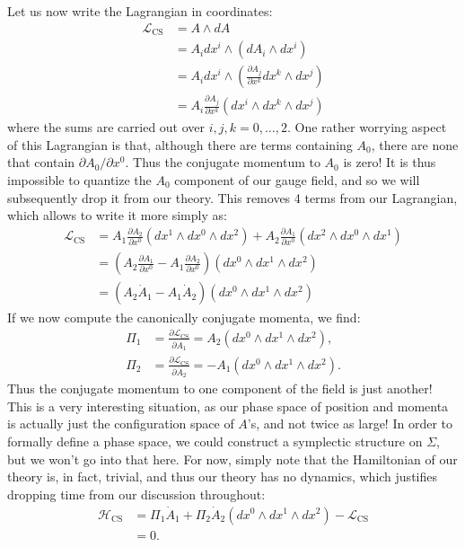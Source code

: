 \documentclass[12pt]{article}
\begin{document}
Let us now write the Lagrangian in coordinates:
\begin{align*}
\mathcal{L}_{\text{CS}}&=A\wedge dA\\
&=A_i dx^i\wedge \left(dA_i\wedge dx^i\right)\\
&=A_i dx^i\wedge\left(\frac{\partial A_j}{\partial x^k} dx^k\wedge dx^j\right)\\
&=A_i\frac{\partial A_j}{\partial x^k}\left(dx^i\wedge dx^k\wedge dx^j \right)
\end{align*}
where the sums are carried out over $i,j,k=0,\ldots,2$. One rather worrying aspect of this Lagrangian is that, although there are terms containing $A_0$, there are none that contain $\partial A_0/\partial x^0$. Thus the conjugate momentum to $A_0$ is zero! It is thus impossible to quantize the $A_0$ component of our gauge field, and so we will subsequently drop it from our theory. This removes 4 terms from our Lagrangian, which allows to write it more simply as:
\begin{align*}
\mathcal{L}_\text{CS}&=A_1\frac{\partial A_2}{\partial x^0}\left(dx^1\wedge dx^0\wedge dx^2\right)+A_2\frac{\partial A_1}{\partial x^0}\left(dx^2\wedge dx^0\wedge dx^1\right)\\
&=\left(A_2\frac{\partial A_1}{\partial x^0}-A_1\frac{\partial A_2}{\partial x^0}\right)\left(dx^0\wedge dx^1\wedge dx^2\right)\\
&=\left(A_2\dot A_1-A_1\dot A_2\right)\left(dx^0\wedge dx^1\wedge dx^2\right)
\end{align*}
If we now compute the canonically conjugate momenta, we find:
\begin{align*}
\Pi_1&=\frac{\partial \mathcal{L}_\text{CS}}{\partial \dot A_1}=A_2\left(dx^0\wedge dx^1\wedge dx^2\right),\\
\Pi_2&=\frac{\partial \mathcal{L}_\text{CS}}{\partial \dot A_2}=-A_1\left(dx^0\wedge dx^1\wedge dx^2\right).
\end{align*}
Thus the conjugate momentum to one component of the field is just another! This is a very interesting situation, as our phase space of position and momenta is actually just the configuration space of $A$'s, and not twice as large! In order to formally define a phase space, we could construct a symplectic structure on $\Sigma$, but we won't go into that here. For now, simply note that the Hamiltonian of our theory is, in fact, trivial, and thus our theory has no dynamics, which justifies dropping time from our discussion throughout:
\begin{align*}
\mathcal{H}_\text{CS}&=\Pi_1 \dot A_1+\Pi_2\dot A_2\left(dx^0\wedge dx^1\wedge dx^2\right)-\mathcal{L}_\text{CS}\\
&=0.
\end{align*}
\end{document}

